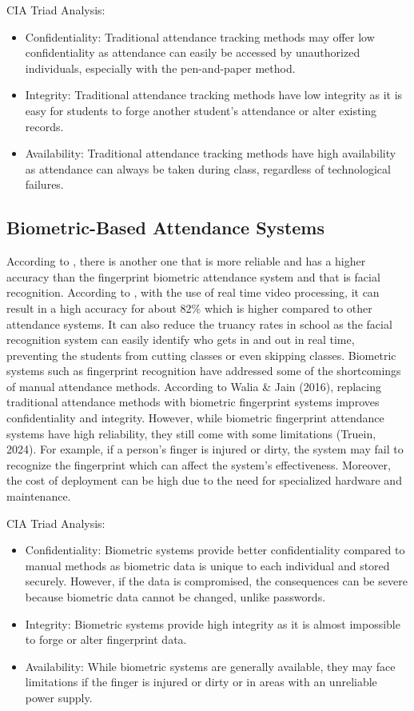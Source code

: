 CIA Triad Analysis:

\begin{itemize}
	\item Confidentiality: Traditional attendance tracking methods may offer low confidentiality as attendance can easily be accessed by unauthorized individuals, especially with the pen-and-paper method.
	\item Integrity: Traditional attendance tracking methods have low integrity as it is easy for students to forge another student's attendance or alter existing records.
	\item Availability: Traditional attendance tracking methods have high availability as attendance can always be taken during class, regardless of technological failures.
\end{itemize}

\subsection{Biometric-Based Attendance Systems}

According to \cite{Truein:2024}, there is another one that is more reliable and has a higher accuracy than the fingerprint biometric attendance system and that is facial recognition. According to \cite{Yang:2020}, with the use of real time video processing, it can result in a high accuracy for about 82\% which is higher compared to other attendance systems. It can also reduce the truancy rates in school as the facial recognition system can easily identify who gets in and out in real time, preventing the students from cutting classes or even skipping classes.
Biometric systems such as fingerprint recognition have addressed some of the shortcomings of manual attendance methods. According to Walia \& Jain (2016), replacing traditional attendance methods with biometric fingerprint systems improves confidentiality and integrity. However, while biometric fingerprint attendance systems have high reliability, they still come with some limitations (Truein, 2024). For example, if a person’s finger is injured or dirty, the system may fail to recognize the fingerprint which can affect the system’s effectiveness. Moreover, the cost of deployment can be high due to the need for specialized hardware and maintenance.

CIA Triad Analysis:

\begin{itemize}
	\item Confidentiality: Biometric systems provide better confidentiality compared to manual methods as biometric data is unique to each individual and stored securely. However, if the data is compromised, the consequences can be severe because biometric data cannot be changed, unlike passwords.
	\item Integrity: Biometric systems provide high integrity as it is almost impossible to forge or alter fingerprint data.
	\item Availability: While biometric systems are generally available, they may face limitations if the finger is injured or dirty or in areas with an unreliable power supply.
\end{itemize}

